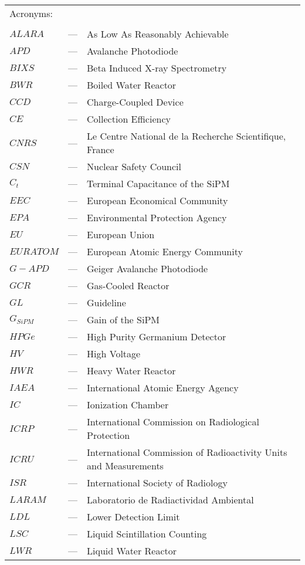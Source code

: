 \begin{longtable}{p{25mm} c p{120mm} }
\multicolumn{3}{l}{Acronyms:}\\
\\
$ALARA$ & --- & As Low As Reasonably Achievable\\
$APD$ & --- & Avalanche Photodiode\\
$BIXS$ & --- & Beta Induced X-ray Spectrometry\\
$BWR$ & --- & Boiled Water Reactor\\
$CCD$ & --- & Charge-Coupled Device\\
$CE$ & --- & Collection Efficiency\\
$CNRS$ & --- & Le Centre National de la Recherche Scientifique, France\\
$CSN$ & --- & Nuclear Safety Council\\
$C_t$ & --- & Terminal Capacitance of the SiPM\\
$EEC$ & --- & European Economical Community\\
$EPA$ & --- & Environmental Protection Agency\\
$EU$ & --- & European Union\\
$EURATOM$ & --- & European Atomic Energy Community\\
$G-APD$ & --- & Geiger Avalanche Photodiode\\
$GCR$ & --- & Gas-Cooled Reactor\\
$GL$ & --- & Guideline\\
$G_{SiPM}$ & --- & Gain of the SiPM\\
$HPGe$ & --- & High Purity Germanium Detector\\
$HV$ & --- & High Voltage\\
$HWR$ & --- & Heavy Water Reactor\\
$IAEA$ & --- & International Atomic Energy Agency \\
$IC$ & --- & Ionization Chamber\\
$ICRP$ & --- & International Commission on Radiological Protection \\
$ICRU$ & --- & International Commission of Radioactivity Units and Measurements\\
$ISR$ & --- & International Society of Radiology \\
$LARAM$ & --- & Laboratorio de Radiactividad Ambiental\\
$LDL$ & --- & Lower Detection Limit\\
$LSC$ & --- & Liquid Scintillation Counting\\
$LWR$ & --- & Liquid Water Reactor\\

\end{longtable}
